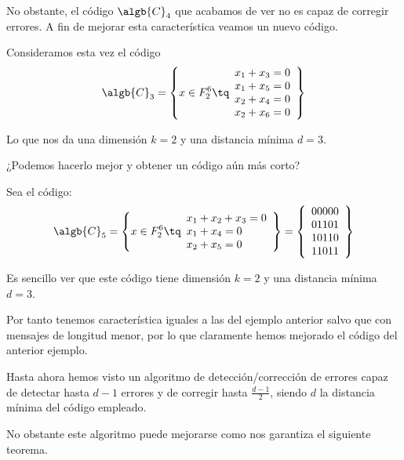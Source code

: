 No obstante, el código $\algb{C}_4$ que acabamos de ver no es capaz de corregir errores. A fin de mejorar esta característica veamos un nuevo código.

\begin{example}
Consideramos esta vez el código
\[\algb{C}_3 = \left\{x\in F_2^6 \tq  \begin{array}{l}
x_1+x_3 = 0 \\
x_1+x_5 = 0 \\
x_2+x_4 = 0 \\
x_2+x_6 = 0
\end{array}\right\}\]

Lo que nos da una dimensión $k= 2$ y una distancia mínima $d=3$.
\end{example}

¿Podemos hacerlo mejor y obtener un código aún más corto?

\begin{example}
Sea el código:
\[\algb{C}_5 = \left\{x\in F_2^6 \tq  \begin{array}{l}
x_1+x_2+x_3= 0 \\
x_1+x_4 = 0 \\
x_2+x_5 = 0
\end{array}\right\}=\left\{\begin{array}{l}
00000\\
01101\\
10110\\
11011
\end{array}\right\}\]

Es sencillo ver que este código tiene dimensión $k=2$ y una distancia mínima $d=3$.

Por tanto tenemos característica iguales a las del ejemplo anterior salvo que con mensajes de longitud menor, por lo que claramente hemos mejorado el código del anterior ejemplo.
\end{example}

Hasta ahora hemos visto un algoritmo de detección/corrección de errores capaz de detectar hasta $d-1$ errores y de corregir hasta $\frac{d-1}{2}$, siendo $d$ la distancia mínima del código empleado.

No obstante este algoritmo puede mejorarse como nos garantiza el siguiente teorema.

